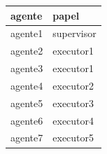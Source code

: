 \documentclass[12pt]{article}
\begin{document}
\begin{table}[H]
\centering
\begin{tabular}{|l|l|}
\hline
\textbf{agente} & \textbf{papel} \\ \hline
agente1 & supervisor \\ \hline
agente2 & executor1 \\ \hline
agente3 & executor1 \\ \hline
agente4 & executor2 \\ \hline
agente5 & executor3 \\ \hline
agente6 & executor4 \\ \hline
agente7 & executor5 \\ \hline
\end{tabular}
\end{table}
\end{document}
